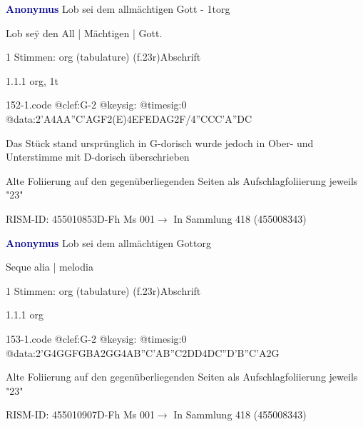 \documentclass[twocolumn, 12pt]{book}
\begin{document}
\par \vspace{16pt} \textcolor{darkblue}{\textbf{Anonymus  }}\hfillplus{\textbf{[152]}}\newline Lob sei dem allmächtigen Gott - 1t\newline org
\par \begin{itshape}[f.23r, at left:] Lob seÿ den All | Mächtigen | Gott.\end{itshape} 
\par \textcolor{darkblue}{}  1 Stimmen: org (tabulature)  (f.23r)\newline Abschrift
\par 1.1.1  org, 1t  
\begin{filecontents*}{152-1.code}
@clef:G-2
@keysig:
@timesig:0
@data:2'A4AA''C'AGF2(E)4EFEDAG2F/4''CCC'A''DC
\end{filecontents*}
\newline %
\par Das Stück stand ursprünglich in G-dorisch wurde jedoch in Ober- und Unterstimme mit D-dorisch überschrieben
\par Alte Foliierung auf den gegenüberliegenden Seiten als Aufschlagfoliierung jeweils "23"
\par RISM-ID: 455010853\newline D-Fh  Ms 001\newline $\rightarrow$ In Sammlung 418 (455008343)
      
\par \vspace{16pt} \textcolor{darkblue}{\textbf{Anonymus  }}\hfillplus{\textbf{[153]}}\newline Lob sei dem allmächtigen Gott\newline org
\par \begin{itshape}[f.23r, at right:] Seque alia | melodia\end{itshape} 
\par \textcolor{darkblue}{}  1 Stimmen: org (tabulature)  (f.23r)\newline Abschrift
\par 1.1.1  org  
\begin{filecontents*}{153-1.code}
@clef:G-2
@keysig:
@timesig:0
@data:2'G4GGFGBA2GG4AB''C'AB''C2DD4DC''D'B''C'A2G
\end{filecontents*}
\newline %
\par Alte Foliierung auf den gegenüberliegenden Seiten als Aufschlagfoliierung jeweils "23"
\par RISM-ID: 455010907\newline D-Fh  Ms 001\newline $\rightarrow$ In Sammlung 418 (455008343)
      
\end{document}
